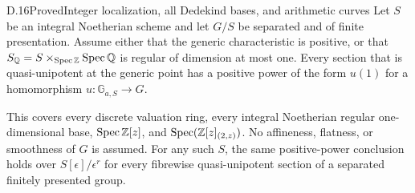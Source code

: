 \begin{statement}{D.16}{Proved}{Integer localization, all Dedekind bases, and arithmetic curves}
Let $S$ be an integral Noetherian scheme and let $G/S$ be separated
and of finite presentation. Assume either that the generic
characteristic is positive, or that
$S_{\mathbb Q}=S\times_{\operatorname{Spec}\mathbb Z}\operatorname{Spec}\mathbb Q$ is regular of
dimension at most one. Every section that is quasi-unipotent
at the generic point has a positive power of the form $u(1)$
for a homomorphism $u:\mathbb G_{a,S}\to G$.

This covers every discrete valuation ring, every integral Noetherian
regular one-dimensional base, $\operatorname{Spec}\mathbb Z[z]$, and
$\operatorname{Spec}(\mathbb Z[z]_{(2,z)})$. No affineness, flatness, or
smoothness of $G$ is assumed. For any such $S$, the same
positive-power conclusion holds over $S[\epsilon]/\epsilon^r$
for every fibrewise quasi-unipotent section of a separated finitely
presented group.
\end{statement}
